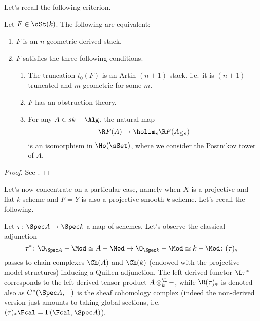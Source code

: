         Let's recall the following criterion.
        \begin{thm}
            \label{thm:lurie_rep_criterion}
            Let $F \in \dSt(k)$. The following are equivalent:
                \begin{enumerate}[label=(\arabic*)]
                    \item $F$ is an $n$-geometric derived stack.
                    \item $F$ satisfies the three following conditions.
                    \begin{enumerate}[label=(\alph*)]
                        \item The truncation $t_0(F)$ is an Artin $(n+1)$-stack, i.e.\ it is $(n+1)$-truncated and $m$-geometric for some $m$.
                        \item $F$ has an obstruction theory.
                        \item For any $A \in sk-\Alg$, the natural map \[\R F(A) \to \holim_s \R F(A_{\leq s}) \] is an isomorphism in $\Ho(\sSet)$, where we consider the Postnikov tower of $A$.
                    \end{enumerate}
                \end{enumerate}
        \end{thm}
        \begin{proof}
            See \cite[Appendix~C]{ToVe:hag2}.
        \end{proof}

        Let's now concentrate on a particular case, namely when $X$ is a projective and flat $k$-scheme and $F = Y$ is also a projective smooth $k$-scheme. 
        Let's recall the following.
        \begin{remark}
            \label{remark:cohomology_complex}
            Let $\tau\colon \Spec A \to \Spec k$ a map of schemes. Let's observe the classical adjunction \[ \tau^*\colon \O_{\Spec A}-\Mod \simeq A-\Mod \to \O_{\Spec k}-\Mod \simeq k-\Mod\colon (\tau)_* \] passes to chain complexes $\Ch(A)$ and $\Ch(k)$ (endowed with the projective model structures) inducing a Quillen adjunction. The left derived functor $\L\tau^*$ corresponds to the left derived tensor product $A \otimes_k^{\L} -$, while $\R(\tau)_*$ is denoted also as $C^*(\Spec A, -)$ is the sheaf cohomology complex (indeed the non-derived version just amounts to taking global sections, i.e.\ $(\tau)_*\Fcal = \Gamma(\Fcal, \Spec A)$).
        \end{remark}
    
